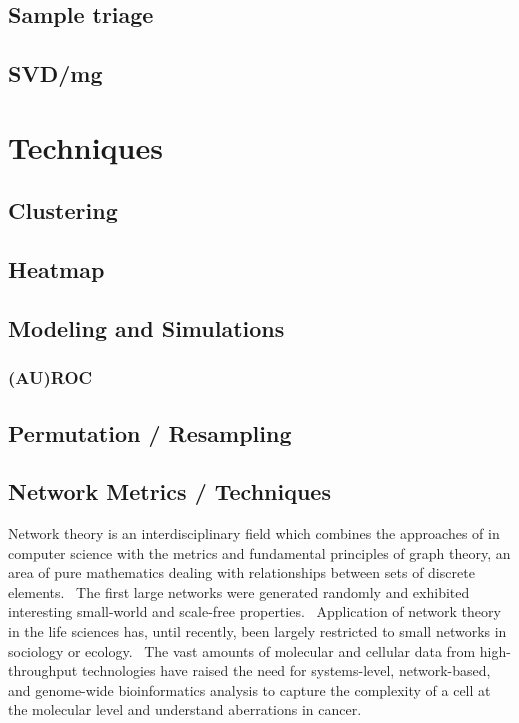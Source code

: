 \subsection{Sample triage}
\subsection{SVD/mg}
\section{Techniques}
\subsection{Clustering}
\subsection{Heatmap}
\subsection{Modeling and Simulations}
\subsubsection{(AU)ROC}
\subsection{Permutation / Resampling}
\subsection{Network Metrics / Techniques}

Network theory is an interdisciplinary field which combines the approaches of in computer science with the metrics and fundamental principles of graph theory, an area of pure mathematics dealing with relationships between sets of discrete elements. \ The first large networks were generated randomly and exhibited interesting small-world and scale-free properties. \ Application of network theory in the life sciences has, until recently, been largely restricted to small networks in sociology or ecology. \ The vast amounts of molecular and cellular data from high-throughput technologies have raised the need for systems-level, network-based, and genome-wide bioinformatics analysis to capture the complexity of a cell at the molecular level and understand aberrations in cancer. 

